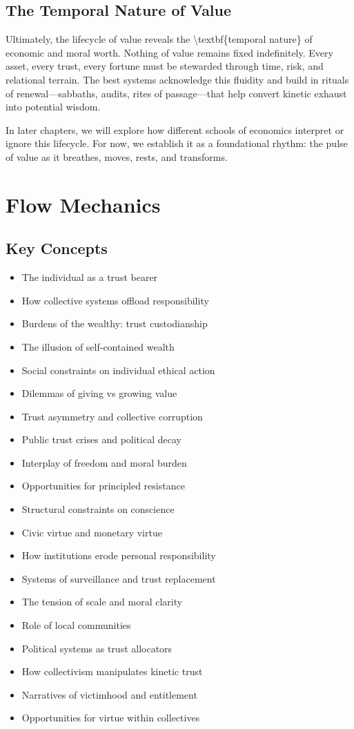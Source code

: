 \documentclass[11pt,oneside]{book}
\begin{document}
\section{The Temporal Nature of Value}

Ultimately, the lifecycle of value reveals the \textbackslash textbf\{temporal nature\} of economic and moral worth. Nothing of value remains fixed indefinitely. Every asset, every trust, every fortune must be stewarded through time, risk, and relational terrain. The best systems acknowledge this fluidity and build in rituals of renewal—sabbaths, audits, rites of passage—that help convert kinetic exhaust into potential wisdom.

In later chapters, we will explore how different schools of economics interpret or ignore this lifecycle. For now, we establish it as a foundational rhythm: the pulse of value as it breathes, moves, rests, and transforms.


\chapter{ Flow Mechanics}

\section{Key Concepts}

\begin{itemize}
\item The individual as a trust bearer
\item How collective systems offload responsibility
\item Burdens of the wealthy: trust custodianship
\item The illusion of self-contained wealth
\item Social constraints on individual ethical action
\item Dilemmas of giving vs growing value
\item Trust asymmetry and collective corruption
\item Public trust crises and political decay
\item Interplay of freedom and moral burden
\item Opportunities for principled resistance
\item Structural constraints on conscience
\item Civic virtue and monetary virtue
\item How institutions erode personal responsibility
\item Systems of surveillance and trust replacement
\item The tension of scale and moral clarity
\item Role of local communities
\item Political systems as trust allocators
\item How collectivism manipulates kinetic trust
\item Narratives of victimhood and entitlement
\item Opportunities for virtue within collectives
\end{itemize}
\end{document}

